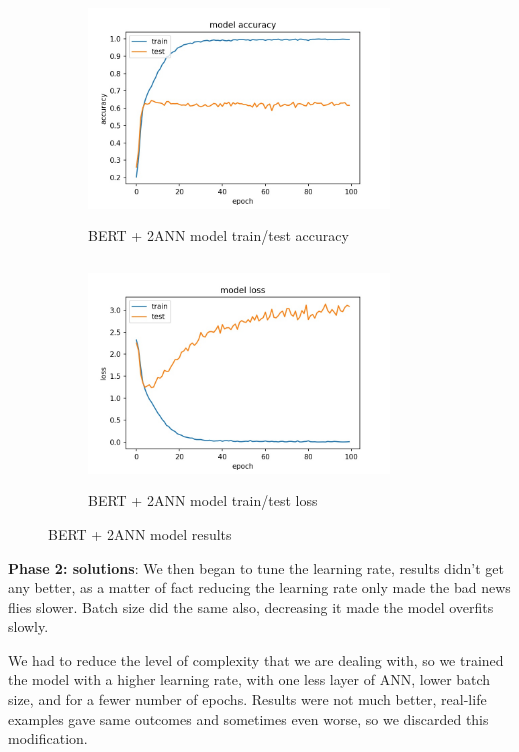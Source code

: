 \begin{figure}[h]
    \begin{subfigure}[b]{0.5\textwidth}
        \includegraphics[width=8cm,height=6cm]{images/bert_acc.jpg}
        \caption{BERT + 2ANN model train/test accuracy}
        \label{fig:bert_acc}
    \end{subfigure}
    \hfill
    \begin{subfigure}[b]{0.5\textwidth}
        \includegraphics[width=8cm,height=6cm]{images/bert_loss.jpg}
        \caption{BERT + 2ANN model train/test loss}
        \label{fig:bert_loss}
    \end{subfigure}
    
    \caption{BERT + 2ANN model results}
    \label{fig:bert_2_results}
\end{figure}

\textbf{Phase 2: solutions}: We then began to tune the learning rate, results didn't get any better, as a matter of fact reducing the learning rate only made the bad news flies slower. Batch size did the same also, decreasing it made the model overfits slowly.

We had to reduce the level of complexity that we are dealing with, so we trained the model with a higher learning rate, with one less layer of ANN, lower batch size, and for a fewer number of epochs. Results were not much better, real-life examples gave same outcomes and sometimes even worse, so we discarded this modification.


